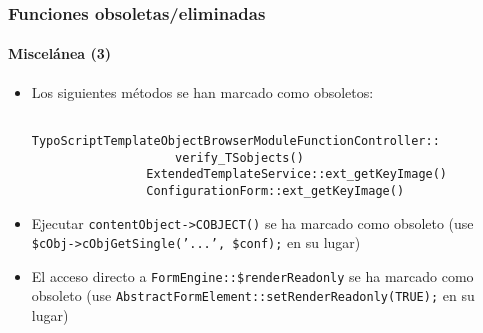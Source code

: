 \begin{frame}[fragile]
	\frametitle{Funciones obsoletas/eliminadas}
	\framesubtitle{Miscelánea (3)}

	\begin{itemize}
		\item Los siguientes métodos se han marcado como obsoletos:

			\begin{lstlisting}
				TypoScriptTemplateObjectBrowserModuleFunctionController::
				    verify_TSobjects()
				ExtendedTemplateService::ext_getKeyImage()
				ConfigurationForm::ext_getKeyImage()
			\end{lstlisting}

 		\item Ejecutar \texttt{contentObject->COBJECT()} se ha marcado como obsoleto\newline
 			\small(use \texttt{\$cObj->cObjGetSingle('...', \$conf);} en su lugar)\normalsize

		\item El acceso directo a \texttt{FormEngine::\$renderReadonly} se ha marcado como obsoleto\newline
			\small(use \texttt{AbstractFormElement::setRenderReadonly(TRUE);} en su lugar)\normalsize

	\end{itemize}

\end{frame}



